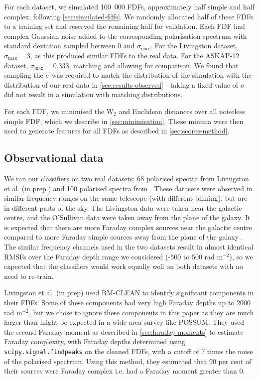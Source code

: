     For each dataset, we simulated 100~000 FDFs, approximately half simple and half complex, following \autoref{sec:simulated-fdfs}. We randomly allocated half of these FDFs to a training set and reserved the remaining half for validation. Each FDF had complex Gaussian noise added to the corresponding polarisation spectrum with standard deviation sampled between 0 and $\sigma_{\max}$. For the Livingston dataset, $\sigma_{\max} = 3$, as this produced similar FDFs to the real data. For the ASKAP-12 dataset, $\sigma_{\max} = 0.333$, matching \citet{brown_classifying_2018} and allowing for comparison. We found that sampling the $\sigma$ was required to match the distribution of the simulation with the distribution of our real data in \autoref{sec:results-observed}---taking a fixed value of $\sigma$ did not result in a simulation with matching distributions.

    For each FDF, we minimised the W$_2$ and Euclidean distances over all noiseless simple FDF, which we describe in \autoref{sec:minimisation}. These minima were then used to generate features for all FDFs as described in \autoref{sec:scores-method}.

  \subsection{Observational data}
  \label{sec:faraday-observational-data}

    We ran our classifiers on two real datasets: 68 polarised spectra from Livingston et al. (in prep.) and 100 polarised spectra from \citet{osullivan_broad-band_2017}. These datasets were observed in similar frequency ranges on the same telescope (with different binning), but are in different parts of the sky. The Livingston data were taken near the galactic centre, and the O'Sullivan data were taken away from the plane of the galaxy. It is expected that there are more Faraday complex sources near the galactic centre compared to more Faraday simple sources away from the plane of the galaxy \citeneeded. The similar frequency channels used in the two datasets result in almost identical RMSFs over the Faraday depth range we considered (-500 to 500 rad m$^{-2}$), so we expected that the classifiers would work equally well on both datasets with no need to re-train.

    Livingston et al. (in prep) used RM-CLEAN to identify significant components in their FDFs. Some of these components had very high Faraday depths up to 2000 rad m$^{-2}$, but we chose to ignore these components in this paper as they are much larger than might be expected in a wide-area survey like POSSUM. They used the second Faraday moment as described in \autoref{sec:faraday-moments} to estimate Faraday complexity, with Faraday depths determined using \texttt{scipy.signal.find\textunderscore{}peaks} on the cleaned FDFs, with a cutoff of 7 times the noise of the polarised spectrum. Using this method, they estimated that 90 per cent of their sources were Faraday complex i.e. had a Faraday moment greater than 0.

